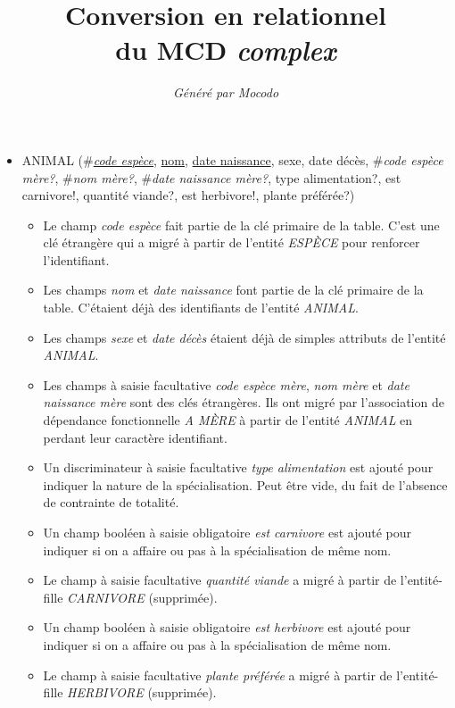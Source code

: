\documentclass[a4paper]{article}
\title{Conversion en relationnel\\du MCD \emph{complex}}
\author{\emph{Généré par Mocodo}}
\newcommand{\relat}[1]{\textsc{#1}}
\newcommand{\attr}[1]{#1}
\newcommand{\prim}[1]{\uline{#1}}
\newcommand{\foreign}[1]{\#\textsl{#1}}
\begin{document}
\maketitle

\begin{itemize}
  \item \relat{ANIMAL} (\foreign{\prim{code espèce}}, \prim{nom}, \prim{date naissance}, \attr{sexe}, \attr{date décès}, \foreign{code espèce mère?}, \foreign{nom mère?}, \foreign{date naissance mère?}, \attr{type alimentation?}, \attr{est carnivore!}, \attr{quantité viande?}, \attr{est herbivore!}, \attr{plante préférée?})
  \begin{itemize}
    \item Le champ \emph{code espèce} fait partie de la clé primaire de la table. C'est une clé étrangère qui a migré à partir de l'entité \emph{ESPÈCE} pour renforcer l'identifiant.
    \item Les champs \emph{nom} et \emph{date naissance} font partie de la clé primaire de la table. C'étaient déjà des identifiants de l'entité \emph{ANIMAL}.
    \item Les champs \emph{sexe} et \emph{date décès} étaient déjà de simples attributs de l'entité \emph{ANIMAL}.
    \item Les champs à saisie facultative \emph{code espèce mère}, \emph{nom mère} et \emph{date naissance mère} sont des clés étrangères. Ils ont migré par l'association de dépendance fonctionnelle \emph{A MÈRE} à partir de l'entité \emph{ANIMAL} en perdant leur caractère identifiant.
    \item Un discriminateur à saisie facultative \emph{type alimentation} est ajouté pour indiquer la nature de la spécialisation. Peut être vide, du fait de l'absence de contrainte de totalité.
    \item Un champ booléen à saisie obligatoire \emph{est carnivore} est ajouté pour indiquer si on a affaire ou pas à la spécialisation de même nom.
    \item Le champ à saisie facultative \emph{quantité viande} a migré à partir de l'entité-fille \emph{CARNIVORE} (supprimée).
    \item Un champ booléen à saisie obligatoire \emph{est herbivore} est ajouté pour indiquer si on a affaire ou pas à la spécialisation de même nom.
    \item Le champ à saisie facultative \emph{plante préférée} a migré à partir de l'entité-fille \emph{HERBIVORE} (supprimée).
  \end{itemize}


\end{itemize}
\end{document}
